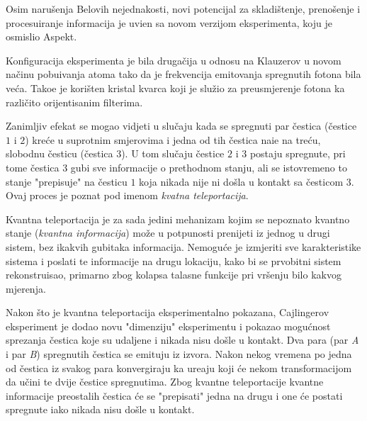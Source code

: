 Osim naru\v senja Belovih nejednakosti, novi potencijal za skladi\v stenje, preno\v senje i procesuiranje informacija je uvi\dj en sa novom verzijom eksperimenta, koju je osmislio Aspekt.

Konfiguracija eksperimenta je bila druga\v cija  u odnosu na Klauzerov u novom na\v cinu pobu\dj ivanja atoma tako da je frekvencija emitovanja
spregnutih fotona bila ve\'ca. Tako\dj e je kori\v sten kristal kvarca koji je slu\v zio za preusmjerenje fotona ka razli\v cito orijentisanim filterima.

Zanimljiv efekat se mogao vidjeti u slu\v caju kada se spregnuti par \v cestica (\v cestice $1$ i $2$) kre\' ce u suprotnim smjerovima i jedna od tih \v cestica nai\dj e na tre\'cu, slobodnu \v cesticu (\v cestica $3$).
U tom slu\v caju \v cestice $2$ i $3$ postaju spregnute, pri tome \v cestica $3$ gubi sve informacije o prethodnom stanju, ali se istovremeno to stanje "prepisuje" na \v cesticu $1$ koja
nikada nije ni do\v sla u kontakt sa \v cesticom $3$. Ovaj proces je poznat pod imenom \textit{kvatna teleportacija}.

Kvantna teleportacija je za sada jedini mehanizam kojim se nepoznato kvantno stanje (\textit{kvantna informacija}) mo\v ze u potpunosti prenijeti iz jednog u drugi sistem,
bez ikakvih gubitaka informacija. Nemogu\'ce je izmjeriti sve karakteristike sistema i poslati te informacije na drugu lokaciju, kako bi se
prvobitni sistem rekonstruisao, primarno zbog kolapsa talasne funkcije pri vr\v senju bilo kakvog mjerenja.

Nakon \v sto je kvantna teleportacija eksperimentalno pokazana, Cajlingerov eksperiment je dodao novu "dimenziju" eksperimentu i pokazao
mogu\' cnost sprezanja \v cestica koje su udaljene i nikada nisu do\v sle u kontakt.
Dva para (par \textit{A} i par \textit{B}) spregnutih \v cestica se emituju iz izvora. Nakon nekog vremena po jedna od \v cestica iz svakog para konvergiraju ka
ure\dj aju koji \' ce nekom transformacijom da u\v cini te dvije \v cestice spregnutima. Zbog kvantne teleportacije kvantne informacije preostalih
\v cestica \' ce se "prepisati" jedna na drugu i one \'ce postati spregnute iako nikada nisu do\v sle u kontakt.

